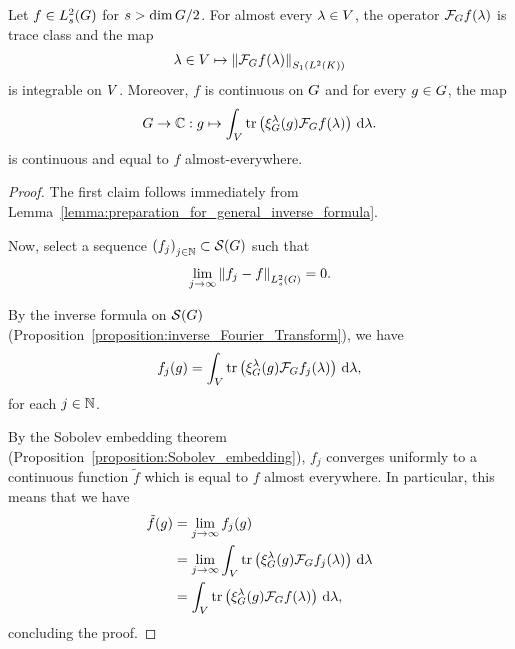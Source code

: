 \begin{proposition}
\label{proposition:general_Fourier_inverse_formula}
    Let $f \in \Sobolev s$ for $s > \dim \Group / 2$.
    For almost every $\lambda \in \VectorSpace$,
    the operator $\Fourier f(\lambda)$ is trace class and the map
    \begin{align*}
        \lambda \in \VectorSpace \mapsto \norm [\SchattenClasses 1 {\Lebesgue 2 \CompactGroup}] {\Fourier f(\lambda)}
    \end{align*}
    is integrable on $\VectorSpace$.
    Moreover, $f$ is continuous on $\Group$ and for every $g \in \Group$, the map
    \begin{align*}
        \Group \to \C : g \mapsto \int_\VectorSpace \tr\left(\Rep \lambda (g) \Fourier f(\lambda)\right) \dd \lambda.
    \end{align*}
    is continuous and equal to $f$ almost-everywhere.
\end{proposition}
\begin{proof}
    The first claim follows immediately from Lemma~\ref{lemma:preparation_for_general_inverse_formula}.

    Now, select a sequence ${(f_j)}_{j \in \N} \subset \Schwartz \Group$ such that
    \begin{align*}
        \lim_{j \to \infty} \norm [\Sobolev s] {f_j - f} = 0.
    \end{align*}

    By the inverse formula on $\Schwartz \Group$ (Proposition~\ref{proposition:inverse_Fourier_Transform}),
    we have
    \begin{align*}
        f_j(g)
        = \int_\VectorSpace \tr\left(\Rep \lambda(g) \Fourier f_j(\lambda)\right) \dd \lambda,
    \end{align*}
    for each $j \in \N$.

    By the Sobolev embedding theorem (Proposition~\ref{proposition:Sobolev_embedding}),
    $f_j$ converges uniformly to a continuous function $\tilde f$ which is equal to $f$ almost everywhere.
    In particular, this means that we have
    \begin{align*}
        \tilde f(g)
        &= \lim_{j \to \infty} f_j(g)\\
        &= \lim_{j \to \infty} \int_\VectorSpace \tr\left(\Rep \lambda(g) \Fourier f_j(\lambda)\right) \dd \lambda\\
        &= \int_\VectorSpace \tr\left(\Rep \lambda(g) \Fourier f(\lambda)\right) \dd \lambda,
    \end{align*}
    concluding the proof.
\end{proof}

